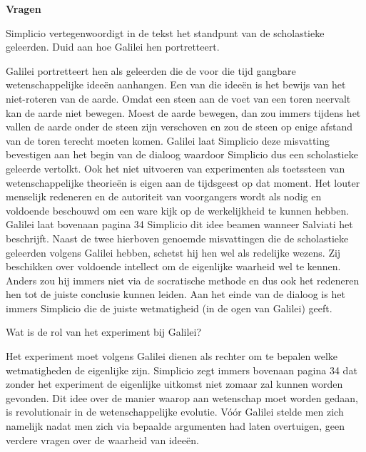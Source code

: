 \documentclass{ximera}
\begin{document}
	
	
	\textbf{Vragen}
	\begin{exercise}
    \begin{question}  Simplicio vertegenwoordigt in de tekst het standpunt van de scholastieke geleerden. Duid aan hoe Galilei hen portretteert.
	\begin{oplossing}
	Galilei portretteert hen als geleerden die de voor die tijd gangbare wetenschappelijke idee\"en aanhangen. 
	Een van die idee\"en is het bewijs van het niet-roteren van de aarde. Omdat een steen aan de voet van een toren neervalt kan de aarde niet bewegen. Moest de aarde bewegen, dan zou immers tijdens het vallen de aarde onder de steen zijn verschoven en zou de steen op enige afstand van de toren terecht moeten komen. Galilei laat Simplicio deze misvatting bevestigen aan het begin van de dialoog waardoor Simplicio dus een scholastieke geleerde vertolkt.
	Ook het niet uitvoeren van experimenten als toetssteen van wetenschappelijke theorie\"en is eigen aan de tijdsgeest op dat moment. Het louter menselijk redeneren en de autoriteit van voorgangers wordt als nodig en voldoende beschouwd om een ware kijk op de werkelijkheid te kunnen hebben. Galilei laat bovenaan pagina 34 Simplicio dit idee beamen wanneer Salviati het beschrijft.
	Naast de twee hierboven genoemde misvattingen die de scholastieke geleerden volgens Galilei hebben, schetst hij hen wel als redelijke wezens. Zij beschikken over voldoende intellect om de eigenlijke waarheid wel te kennen. Anders zou hij immers niet via de socratische methode en dus ook het redeneren hen tot de juiste conclusie kunnen leiden. Aan het einde van de dialoog is het immers Simplicio die de juiste wetmatigheid (in de ogen van Galilei) geeft.
	\end{oplossing}
	\end{question}
	
    \begin{question}  Wat is de rol van het experiment bij Galilei?
	\begin{oplossing}
	Het experiment moet volgens Galilei dienen als rechter om te bepalen welke wetmatigheden de eigenlijke zijn. Simplicio zegt immers bovenaan pagina 34 dat zonder het experiment de eigenlijke uitkomst niet zomaar zal kunnen worden gevonden. Dit idee over de manier waarop aan wetenschap moet worden gedaan, is revolutionair in de wetenschappelijke evolutie. V\'o\'or Galilei stelde men zich namelijk nadat men zich via bepaalde argumenten had laten overtuigen, geen verdere vragen over de waarheid van idee\"en. 
	\end{oplossing}
	\end{question}
	

\end{exercise}
\end{document}
